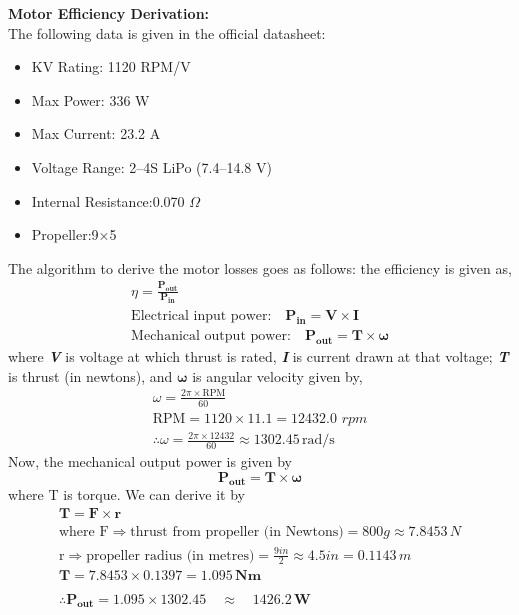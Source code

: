 \documentclass[12pt]{report}
\begin{document}
      \noindent \textbf{\large Motor Efficiency Derivation:}\\
      The following data is given in the official datasheet:
      \begin{itemize}
        \item KV Rating: \hfill1120 RPM/V
        \item Max Power: \hfill336 W
        \item Max Current: \hfill23.2 A
        \item Voltage Range: \hfill2–4S LiPo (7.4–14.8 V)
        \item Internal Resistance:\hfill 0.070 $\Omega$
        \item Propeller:\hfill 9×5
      \end{itemize}
      The algorithm to derive the motor losses goes as follows: the efficiency is given as,
      \begin{gather*}
        \eta = \frac{\boldsymbol{P_{out}}}{\boldsymbol{P_{in}}}  \\
        \text{Electrical input power:}\quad \boldsymbol{ P_{in} = V \times I} \\
        \text{Mechanical output power:} \quad \boldsymbol{ P_{out} = T \times \omega}
      \end{gather*}
      where \textbf{\textit{V}} is voltage at which thrust is rated, \textbf{\textit{I}} is current drawn at that voltage; \textbf{\textit{T}} is thrust (in newtons), and $ \boldsymbol{\omega} $ is angular velocity given by, 
      \begin{gather*}
        \omega = \frac{2 \pi \times \text{RPM}}{60} \\
        \text{RPM} = 1120 \times 11.1 = 12432.0 \, \,  rpm \\
        \therefore \omega = \frac{2 \pi \times 12432}{60} \approx 1302.45 \, \text{rad/s}
      \end{gather*}
      Now, the mechanical output power is given by \[ \boldsymbol{P_{out} = T \times \omega} \] where T is torque. We can derive it by 
      \begin{gather*}
        \boldsymbol{T = F \times r} \\
        \text{where F} \Rightarrow \text{thrust from propeller (in Newtons)} = 800g \approx 7.8453 \, N \\
        \text{r} \Rightarrow \text{propeller radius (in metres)} = \frac{9in}{2} \approx 4.5in = 0.1143 \, m \\
        \boldsymbol{T = 7.8453 \times 0.1397 = 1.095 \, Nm} \\ \\
        \therefore \boldsymbol{P_{out}} = 1.095 \times 1302.45 \quad \approx \quad \boldsymbol{1426.2 \, W}
      \end{gather*}
\end{document}
